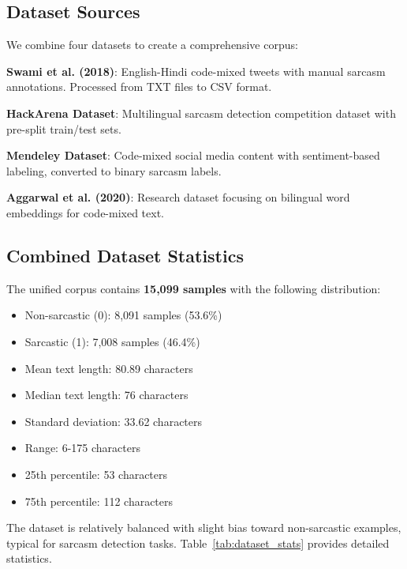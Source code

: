 \documentclass[11pt]{article}
\begin{document}
\subsection{Dataset Sources}

We combine four datasets to create a comprehensive corpus:

\textbf{Swami et al. (2018)}: English-Hindi code-mixed tweets with manual sarcasm annotations. Processed from TXT files to CSV format.

\textbf{HackArena Dataset}: Multilingual sarcasm detection competition dataset with pre-split train/test sets.

\textbf{Mendeley Dataset}: Code-mixed social media content with sentiment-based labeling, converted to binary sarcasm labels.

\textbf{Aggarwal et al. (2020)}: Research dataset focusing on bilingual word embeddings for code-mixed text.

\subsection{Combined Dataset Statistics}

The unified corpus contains \textbf{15,099 samples} with the following distribution:
\begin{itemize}
\item Non-sarcastic (0): 8,091 samples (53.6\%)
\item Sarcastic (1): 7,008 samples (46.4\%)
\item Mean text length: 80.89 characters
\item Median text length: 76 characters
\item Standard deviation: 33.62 characters
\item Range: 6-175 characters
\item 25th percentile: 53 characters
\item 75th percentile: 112 characters
\end{itemize}

The dataset is relatively balanced with slight bias toward non-sarcastic examples, typical for sarcasm detection tasks. Table~\ref{tab:dataset_stats} provides detailed statistics.
\end{document}
